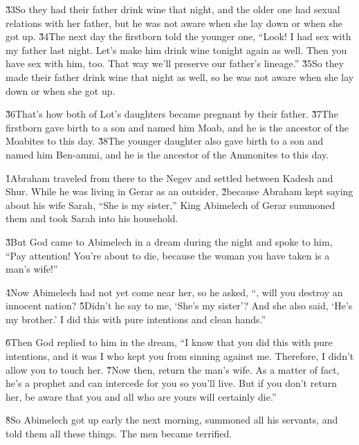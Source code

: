 \v{33}So they had their father drink wine that night, and the older one had sexual relations with her father, but he was not aware when she lay down or when she got up. \v{34}The next day the firstborn told the younger one, ``Look! I had sex with my father last night. Let's make him drink wine tonight again as well. Then you have sex with him, too. That way we'll preserve our father's lineage.'' \v{35}So they made their father drink wine that night as well, so he was not aware when she lay down or when she got up.

\v{36}That's how both of Lot's daughters became pregnant by their father. \v{37}The firstborn gave birth to a son and named him Moab, and he is the ancestor of the Moabites to this day. \v{38}The younger daughter also gave birth to a son and named him Ben-ammi, and he is the ancestor of the Ammonites to this day.

\v{1}Abraham traveled from there to the Negev and settled between Kadesh and Shur. While he was living in Gerar as an outsider, \v{2}because Abraham kept saying about his wife Sarah, ``She is my sister,'' King Abimelech of Gerar summoned them and took Sarah into his household.

\v{3}But God came to Abimelech in a dream during the night and spoke to him, ``Pay attention! You're about to die, because the woman you have taken is a man's wife!''

\v{4}Now Abimelech had not yet come near her, so he asked, ``, will you destroy an innocent nation? \v{5}Didn't he say to me, `She's my sister'? And she also said, `He's my brother.' I did this with pure intentions and clean hands.''

\v{6}Then God replied to him in the dream, ``I know that you did this with pure intentions, and it was I who kept you from sinning against me. Therefore, I didn't allow you to touch her. \v{7}Now then, return the man's wife. As a matter of fact, he's a prophet and can intercede for you so you'll live. But if you don't return her, be aware that you and all who are yours will certainly die.''

\v{8}So Abimelech got up early the next morning, summoned all his servants, and told them all these things. The men became terrified.

